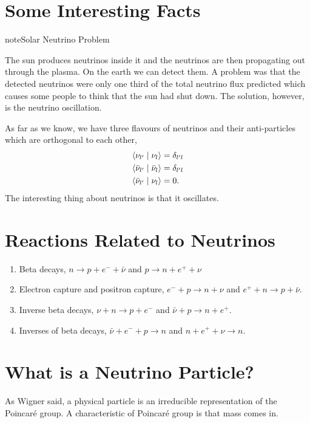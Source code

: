 \documentclass[letterpaper,12pt,english]{sphinxmanual}
\newcommand{\braket}[2]{\langle #1 \mid #2 \rangle}
\begin{document}
\section{Some Interesting Facts}
\label{preliminary:some-interesting-facts}
\begin{notice}{note}{Solar Neutrino Problem}

The sun produces neutrinos inside it and the neutrinos are then propagating out through the plasma. On the earth we can detect them. A problem was that the detected neutrinos were only one third of the total neutrino flux predicted which causes some people to think that the sun had shut down. The solution, however, is the neutrino oscillation.
\end{notice}

As far as we know, we have three flavours of neutrinos and their anti-particles which are  orthogonal to each other,
\begin{gather}
\begin{split}\braket{\nu_{l'}}{\nu_l} &= \delta_{l'l} \\
\braket{\bar\nu_{l'}}{\bar\nu_l} &= \delta_{l'l} \\
\braket{\bar\nu_{l'}}{\nu_l} &= 0.\end{split}\notag
\end{gather}
The interesting thing about neutrinos is that it oscillates.


\section{Reactions Related to Neutrinos}
\label{preliminary:reactions-related-to-neutrinos}\begin{enumerate}
\item {} 
Beta decays, \(n\to p + e^- +\bar \nu\) and \(p\to n + e^+ +\nu\)

\item {} 
Electron capture and positron capture, \(e^- + p\to n+\nu\) and \(e^+ + n \to p + \bar \nu\).

\item {} 
Inverse beta decays, \(\nu+ n \to p+e^-\) and \(\bar\nu + p \to n + e^+\).

\item {} 
Inverses of beta decays, \(\bar\nu + e^- + p \to n\) and \(n+e^++\nu \to n\).

\end{enumerate}


\section{What is a Neutrino Particle?}
\label{preliminary:what-is-a-neutrino-particle}
As Wigner said, a physical particle is an irreducible representation of the Poincaré group. A characteristic of Poincaré group is that mass comes in.
\end{document}
